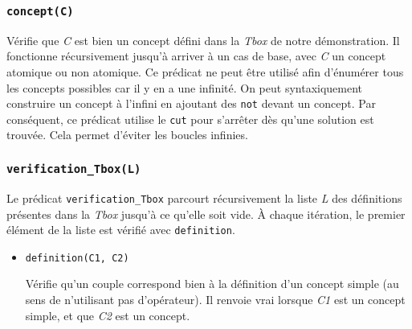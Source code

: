 \documentclass{article}
\newcommand{\code}[1]{\colorbox{light-gray}{\texttt{#1}}}
\begin{document}
\subsubsection{\code{concept(C)}}
Vérifie que \textit{C} est bien un concept défini dans la \textit{Tbox} de notre démonstration. Il fonctionne récursivement jusqu'à arriver à un cas de base, avec \textit{C} un concept atomique ou non atomique. Ce prédicat ne peut être utilisé afin d'énumérer tous les concepts possibles car il y en a une infinité. On peut syntaxiquement construire un concept à l'infini en ajoutant des \code{not} devant un concept. Par conséquent, ce prédicat utilise le \code{cut} pour s'arrêter dès qu'une solution est trouvée. Cela permet d'éviter les boucles infinies.

\subsubsection{\code{verification\_Tbox(L)}}
Le prédicat \code{verification\_Tbox} parcourt récursivement la liste \textit{L} des définitions présentes dans la \textit{Tbox} jusqu'à ce qu'elle soit vide. À chaque itération, le premier élément de la liste est vérifié avec \code{definition}.
\begin{itemize}
    \item \code{definition(C1, C2)}
    
    Vérifie qu'un couple correspond bien à la définition d'un concept simple (au sens de n'utilisant pas d'opérateur). Il renvoie vrai lorsque \textit{C1} est un concept simple, et que \textit{C2} est un concept.
\end{itemize}
\end{document}
